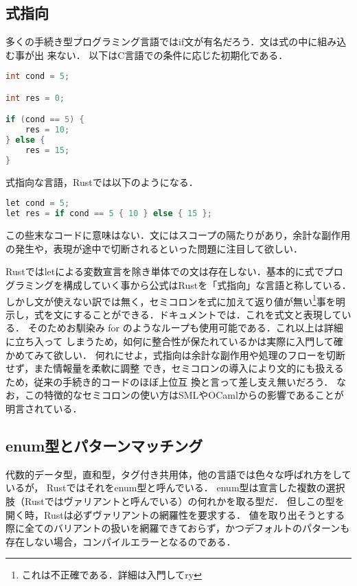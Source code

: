 \subsection{式指向}
多くの手続き型プログラミング言語ではif文が有名だろう．文は式の中に組み込む事が出
来ない．
以下はC言語での条件に応じた初期化である．

\begin{lstlisting}[language={C},caption=Cにおけるif文,label=c_if]
int cond = 5;

int res = 0;

if (cond == 5) {
    res = 10;
} else {
    res = 15;
}
\end{lstlisting}

式指向な言語，Rustでは以下のようになる．

\begin{lstlisting}[language={C++},caption=Rustにおけるif式,label=rust_if]
let cond = 5;
let res = if cond == 5 { 10 } else { 15 };
\end{lstlisting}

この些末なコードに意味はない．文にはスコープの隔たりがあり，余計な副作用の発生や，表現が途中で切断されるといった問題に注目して欲しい．

Rustではletによる変数宣言を除き単体での文は存在しない．基本的に式でプログラミングを構成していく事から公式はRustを「式指向」な言語と称している．
しかし文が使えない訳では無く，セミコロンを式に加えて返り値が無い\footnote{これは不正確である．詳細は入門してry}事を明示し，式を文にすることができる．ドキュメントでは．これを式文と表現している．
そのためお馴染み for のようなループも使用可能である．これ以上は詳細に立ち入って
しまうため，如何に整合性が保たれているかは実際に入門して確かめてみて欲しい．
何れにせよ，式指向は余計な副作用や処理のフローを切断せず，また情報量を柔軟に調整
でき，セミコロンの導入により文的にも扱えるため，従来の手続き的コードのほぼ上位互
換と言って差し支え無いだろう．
なお，この特徴的なセミコロンの使い方はSMLやOCamlからの影響であることが明言されている．

\subsection{enum型とパターンマッチング}
代数的データ型，直和型，タグ付き共用体，他の言語では色々な呼ばれ方をしているが，
Rustではそれをenum型と呼んでいる．
enum型は宣言した複数の選択肢（Rustではヴァリアントと呼んでいる）の何れかを取る型だ．
但しこの型を開く時，Rustは必ずヴァリアントの網羅性を要求する．
値を取り出そうとする際に全てのバリアントの扱いを網羅できておらず，かつデフォルトのパターンも存在しない場合，コンパイルエラーとなるのである．

